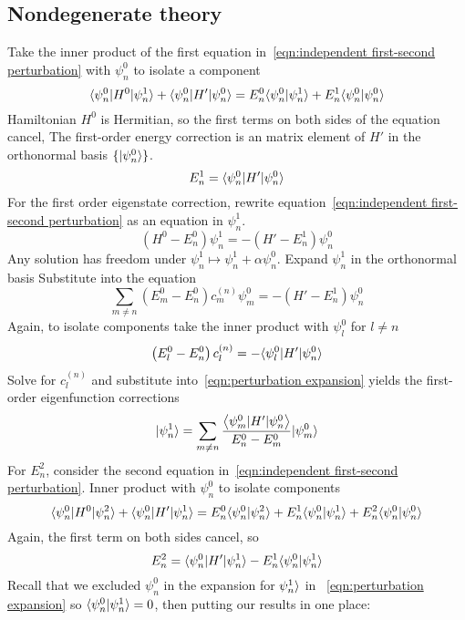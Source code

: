 \subsection{Nondegenerate theory}
Take the inner product of the first equation in~\ref{eqn:independent first-second perturbation}
with $\psi_n^0$ to isolate a component 
\[ 
    \langle \psi_n^0|H^0|\psi_n^1\rangle + \langle \psi_n^0|H'|\psi_n^0\rangle 
    = E_n^0\langle \psi_n^0|\psi_n^1\rangle + E_n^1\langle \psi_n^0|\psi_n^0\rangle
\] 
Hamiltonian $H^0$ is Hermitian, so the first terms on both sides of the equation cancel, 
The first-order energy correction is an matrix 
element of $H'$ in the orthonormal basis $\{|\psi_n^0\rangle\}$. 
\[ 
    E_n^1 = \langle \psi_n^0|H'|\psi_n^0\rangle 
\] 
For the first order eigenstate correction, rewrite 
equation~\ref{eqn:independent first-second perturbation} as 
an equation in $\psi_n^1$. 
\[ 
    (H^0 - E_n^0)\psi_n^1 = -(H' - E_n^1)\psi_n^0
\] 
Any solution has freedom under $\psi_n^1\mapsto \psi_n^1 + \alpha \psi_n^0$. 
Expand $\psi_n^1$ in the orthonormal basis 
Substitute into the equation 
\[ 
    \sum_{m\neq n}\left(E_m^0 - E_n^0\right)c_m^{(n)}\psi_m^0 = -(H' - E_n^1)\psi_n^0
\] 
Again, to isolate components take the inner product with $\psi_l^0$ for $l\neq n$ 
\[
    \left(E_l^0 - E_n^0\right)c_l^{(n)} = -\langle \psi_l^0|H'|\psi_n^0\rangle 
\]
Solve for $c_l^{(n)}$ and substitute into~\ref{eqn:perturbation expansion} yields 
the first-order eigenfunction corrections 
\[
    |\psi_n^1\rangle = \sum_{m\neq n} \dfrac{\left\langle \psi_m^0|H'|\psi_n^0 \right\rangle}{E_n^0 - E_m^0}|\psi_m^0\rangle
\] 
For $E_n^2$, consider the second equation in~\ref{eqn:independent first-second perturbation}. 
Inner product with $\psi_n^0$ to isolate components 
\[ 
    \langle \psi_n^0|H^0|\psi_n^2\rangle + \langle \psi_n^0|H'|\psi_n^1\rangle 
    = E_n^0 \langle \psi_n^0|\psi_n^2\rangle + E_n^1\langle \psi_n^0|\psi_n^1\rangle + 
    E_n^2\langle \psi_n^0|\psi_n^0\rangle 
\] 
Again, the first term on both sides cancel, so 
\[ 
    E_n^2 = \langle \psi_n^0|H'|\psi_n^1\rangle - E_n^1\langle \psi_n^0|\psi_n^1\rangle 
\] 
Recall that we excluded $\psi_n^0$ in the expansion for $\psi_n^1\rangle$ in
~\ref{eqn:perturbation expansion} so $\langle \psi_n^0|\psi_n^1\rangle = 0$, then 
putting our results in one place:
\begin{mdframed}
\end{mdframed}


